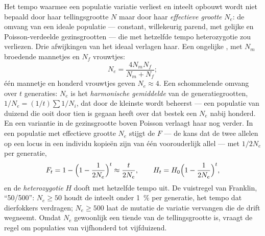 \begin{theorem}\label{thm:b3:conservation-biology:ne}
Het tempo waarmee een populatie variatie verliest en inteelt opbouwt
wordt niet bepaald door haar tellingsgrootte $N$ maar door haar
\emph{effectieve grootte} $N_{e}$: de omvang van een ideale populatie
--- constant, willekeurig parend, met gelijke  en
Poisson-verdeelde gezinsgrootten --- die met hetzelfde tempo
heterozygotie zou verliezen. Drie afwijkingen van het ideaal verlagen
haar. Een ongelijke , met $N_{m}$ broedende
mannetjes en $N_{f}$ vrouwtjes:
\[
N_{e} = \frac{4N_{m}N_{f}}{N_{m} + N_{f}} ;
\]
één mannetje en honderd vrouwtjes geven $N_{e} \approx 4$. Een
schommelende omvang over $t$ generaties: $N_{e}$ is het
\emph{harmonische gemiddelde} van de generatiegrootten,
$1/N_{e} = (1/t)\sum 1/N_{i}$, dat door de kleinste wordt beheerst ---
een populatie van duizend die ooit door tien is gegaan heeft over dat
bestek een $N_{e}$ nabij honderd. En een variantie in de gezinsgrootte
boven Poisson verlaagt haar nog verder. In een populatie met effectieve
grootte $N_{e}$ stijgt de \emph{} $F$ --- de kans dat
de twee allelen op een locus in een individu kopieën zijn van één
voorouderlijk allel --- met $1/2N_{e}$ per generatie,
\[
F_{t} = 1 - \Bigl(1 - \frac{1}{2N_{e}}\Bigr)^{t} \approx \frac{t}{2N_{e}},
\qquad H_{t} = H_{0}\Bigl(1 - \frac{1}{2N_{e}}\Bigr)^{t} ,
\]
en de \emph{heterozygotie} $H$ dooft met hetzelfde tempo uit. De
vuistregel van Franklin, ``50/500'': $N_{e} \ge 50$ houdt de inteelt
onder \qty{1}{\%} per generatie, het tempo dat dierfokkers verdragen;
$N_{e} \ge
500$ laat de mutatie de variatie vervangen die de drift wegneemt. Omdat
$N_{e}$ gewoonlijk een tiende van de tellingsgrootte is, vraagt de
regel om populaties van vijfhonderd tot vijfduizend.
\end{theorem}
